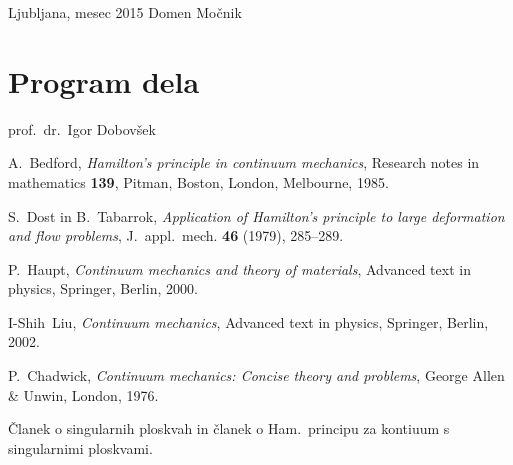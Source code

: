\documentclass[12pt,a4paper]{report}
\begin{document}
\noindent Ljubljana, mesec 2015 \hfill Domen Močnik
\pagebreak

\tableofcontents
\pagebreak

\chapter*{Program dela}


\null

\noindent prof.~dr.~Igor Dobovšek
\pagebreak


\pagebreak










\begin{thebibliography}{99}

A.~Bedford, \emph{Hamilton's principle in continuum mechanics}, Research notes in mathematics {\bf 139},
Pitman, Boston, London, Melbourne, 1985.

S.~Dost in B.~Tabarrok, \emph{Application of Hamilton's principle to large deformation and flow problems},
J.~appl.~mech. {\bf 46} (1979), 285--289.

P.~Haupt, \emph{Continuum mechanics and theory of materials}, Advanced text in physics,
Springer, Berlin, 2000.

I-Shih~Liu, \emph{Continuum mechanics}, Advanced text in physics,
Springer, Berlin, 2002.

P.~Chadwick, \emph{Continuum mechanics: Concise theory and problems},
George Allen \& Unwin, London, 1976.

\textcolor[rgb]{1,0,0}{Članek o singularnih ploskvah in članek o Ham.~principu za kontiuum s singularnimi ploskvami.}

\end{thebibliography}
\end{document}
